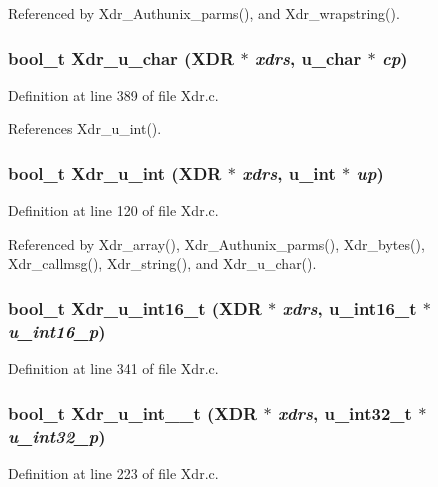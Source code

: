 Referenced by Xdr\_\-Authunix\_\-parms(), and Xdr\_\-wrapstring().
\subsubsection{\setlength{\rightskip}{0pt plus 5cm}bool\_\-t Xdr\_\-u\_\-char (XDR $\ast$ {\em xdrs}, u\_\-char $\ast$ {\em cp})}\label{Xdr_8c_a17}




Definition at line 389 of file Xdr.c.

References Xdr\_\-u\_\-int().
\subsubsection{\setlength{\rightskip}{0pt plus 5cm}bool\_\-t Xdr\_\-u\_\-int (XDR $\ast$ {\em xdrs}, u\_\-int $\ast$ {\em up})}\label{Xdr_8c_a7}




Definition at line 120 of file Xdr.c.

Referenced by Xdr\_\-array(), Xdr\_\-Authunix\_\-parms(), Xdr\_\-bytes(), Xdr\_\-callmsg(), Xdr\_\-string(), and Xdr\_\-u\_\-char().
\subsubsection{\setlength{\rightskip}{0pt plus 5cm}bool\_\-t Xdr\_\-u\_\-int16\_\-t (XDR $\ast$ {\em xdrs}, u\_\-int16\_\-t $\ast$ {\em u\_\-int16\_\-p})}\label{Xdr_8c_a15}




Definition at line 341 of file Xdr.c.
\subsubsection{\setlength{\rightskip}{0pt plus 5cm}bool\_\-t Xdr\_\-u\_\-int\_\_\-t (XDR $\ast$ {\em xdrs}, u\_\-int32\_\-t $\ast$ {\em u\_\-int32\_\-p})}\label{Xdr_8c_a11}




Definition at line 223 of file Xdr.c.
